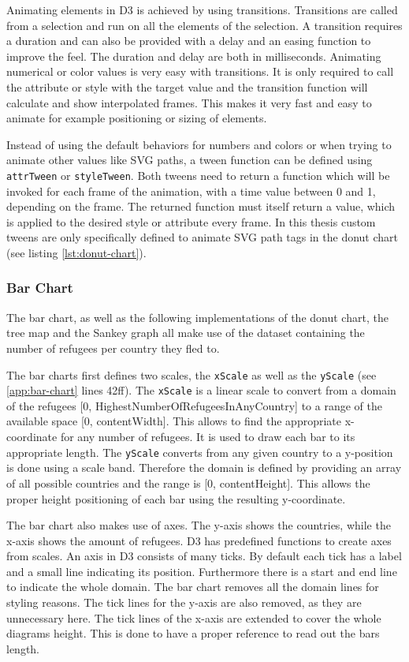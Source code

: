Animating elements in D3 is achieved by using transitions. Transitions are called from a selection and run on all the elements of the selection. A transition requires a duration and can also be provided with a delay and an easing function to improve the feel. The duration and delay are both in milliseconds. Animating numerical or color values is very easy with transitions. It is only required to call the attribute or style with the target value and the transition function will calculate and show interpolated frames. This makes it very fast and easy to animate for example positioning or sizing of elements.

Instead of using the default behaviors for numbers and colors or when trying to animate other values like SVG paths, a tween function can be defined using \verb|attrTween| or \verb|styleTween|. Both tweens need to return a function which will be invoked for each frame of the animation, with a time value between 0 and 1, depending on the frame. The returned function must itself return a value, which is applied to the desired style or attribute every frame. In this thesis custom tweens are only specifically defined to animate SVG path tags in the donut chart (see listing \ref{lst:donut-chart}).


\subsubsection{Bar Chart}
The bar chart, as well as the following implementations of the donut chart, the tree map and the Sankey graph all make use of the dataset containing the number of refugees per country they fled to.

The bar charts first defines two scales, the \texttt{xScale} as well as the \texttt{yScale} (see \ref{app:bar-chart} lines 42ff). The \texttt{xScale} is a linear scale to convert from a domain of the refugees [0, HighestNumberOfRefugeesInAnyCountry] to a range of the available space [0, contentWidth]. This allows to find the appropriate x-coordinate for any number of refugees. It is used to draw each bar to its appropriate length. The \texttt{yScale} converts from any given country to a y-position is done using a scale band. Therefore the domain is defined by providing an array of all possible countries and the range is [0, contentHeight]. This allows the proper height positioning of each bar using the resulting y-coordinate.

The bar chart also makes use of axes. The y-axis shows the countries, while the x-axis shows the amount of refugees. D3 has predefined functions to create axes from scales. An axis in D3 consists of many ticks. By default each tick has a label and a small line indicating its position. Furthermore there is a start and end line to indicate the whole domain. The bar chart removes all the domain lines for styling reasons. The tick lines for the y-axis are also removed, as they are unnecessary here. The tick lines of the x-axis are extended to cover the whole diagrams height. This is done to have a proper reference to read out the bars length.

